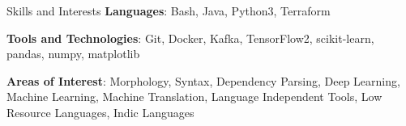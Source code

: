 \begin{rSection}{Skills and Interests}
    {\textbf{Languages}: Bash, Java, Python3, Terraform}
    
    {\textbf{Tools and Technologies}: Git, Docker, Kafka, TensorFlow2, scikit-learn, pandas, numpy, matplotlib}
    
    {\textbf{Areas of Interest}: Morphology, Syntax, Dependency Parsing, Deep Learning, Machine Learning, Machine Translation, Language Independent Tools, Low Resource Languages, Indic Languages}
\end{rSection}
